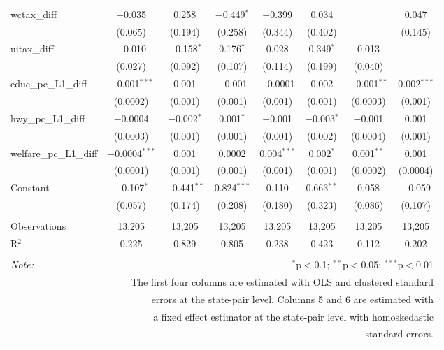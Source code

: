 \begin{table}[!htbp]
\begin{tabular}{@{\extracolsep{5pt}}lccccccc}
  wctax\_diff & $-$0.035 & 0.258 & $-$0.449$^{*}$ & $-$0.399 & 0.034 &  & 0.047 \\ 
  & (0.065) & (0.194) & (0.258) & (0.344) & (0.402) &  & (0.145) \\ 
  uitax\_diff & $-$0.010 & $-$0.158$^{*}$ & 0.176$^{*}$ & 0.028 & 0.349$^{*}$ & 0.013 &  \\ 
  & (0.027) & (0.092) & (0.107) & (0.114) & (0.199) & (0.040) &  \\ 
  educ\_pc\_L1\_diff & $-$0.001$^{***}$ & 0.001 & $-$0.001 & $-$0.0001 & 0.002 & $-$0.001$^{**}$ & 0.002$^{***}$ \\ 
  & (0.0002) & (0.001) & (0.001) & (0.001) & (0.001) & (0.0003) & (0.001) \\ 
  hwy\_pc\_L1\_diff & $-$0.0004 & $-$0.002$^{*}$ & 0.001$^{*}$ & $-$0.001 & $-$0.003$^{*}$ & $-$0.001 & 0.001 \\ 
  & (0.0003) & (0.001) & (0.001) & (0.001) & (0.002) & (0.0004) & (0.001) \\ 
  welfare\_pc\_L1\_diff & $-$0.0004$^{***}$ & 0.001 & 0.0002 & 0.004$^{***}$ & 0.002$^{*}$ & 0.001$^{**}$ & 0.001 \\ 
  & (0.0001) & (0.001) & (0.001) & (0.001) & (0.001) & (0.0002) & (0.0004) \\ 
  Constant & $-$0.107$^{*}$ & $-$0.441$^{**}$ & 0.824$^{***}$ & 0.110 & 0.663$^{**}$ & 0.058 & $-$0.059 \\ 
  & (0.057) & (0.174) & (0.208) & (0.180) & (0.323) & (0.086) & (0.107) \\ 
 \hline \\[-1.8ex] 
Observations & 13,205 & 13,205 & 13,205 & 13,205 & 13,205 & 13,205 & 13,205 \\ 
R$^{2}$ & 0.225 & 0.829 & 0.805 & 0.238 & 0.423 & 0.112 & 0.202 \\ 
\hline 
\hline \\[-1.8ex] 
\textit{Note:}  & \multicolumn{7}{r}{$^{*}$p$<$0.1; $^{**}$p$<$0.05; $^{***}$p$<$0.01} \\ 
 & \multicolumn{7}{r}{The first four columns are estimated with OLS and clustered standard} \\ 
 & \multicolumn{7}{r}{ errors at the state-pair level. Columns 5 and 6 are estimated with} \\ 
 & \multicolumn{7}{r}{a fixed effect estimator at the state-pair level with homoskedastic} \\ 
 & \multicolumn{7}{r}{standard errors.} \\ 
\end{tabular} 
\end{table} 
